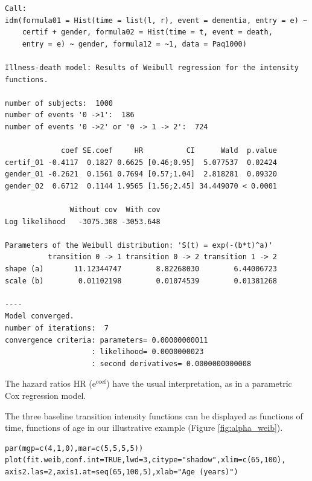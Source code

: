 \documentclass[article]{jss}
\begin{document}
\begin{verbatim}
Call:
idm(formula01 = Hist(time = list(l, r), event = dementia, entry = e) ~ 
    certif + gender, formula02 = Hist(time = t, event = death, 
    entry = e) ~ gender, formula12 = ~1, data = Paq1000)

Illness-death model: Results of Weibull regression for the intensity functions.

number of subjects:  1000 
number of events '0 ->1':  186 
number of events '0 ->2' or '0 -> 1 -> 2':  724 

             coef SE.coef     HR          CI      Wald  p.value
certif_01 -0.4117  0.1827 0.6625 [0.46;0.95]  5.077537  0.02424
gender_01 -0.2621  0.1561 0.7694 [0.57;1.04]  2.818281  0.09320
gender_02  0.6712  0.1144 1.9565 [1.56;2.45] 34.449070 < 0.0001

               Without cov  With cov
Log likelihood   -3075.308 -3053.648

Parameters of the Weibull distribution: 'S(t) = exp(-(b*t)^a)'
          transition 0 -> 1 transition 0 -> 2 transition 1 -> 2
shape (a)       11.12344747        8.82268030        6.44006723
scale (b)        0.01102198        0.01074539        0.01381268

----
Model converged.
number of iterations:  7 
convergence criteria: parameters= 0.00000000011 
                    : likelihood= 0.0000000023 
                    : second derivatives= 0.0000000000008
\end{verbatim}


The hazard ratios HR (\(\mathrm{e}^{\text{coef}}\)) have the usual interpretation, 
as in a parametric Cox regression model.

The three baseline transition intensity functions can be displayed as
functions of time, functions of age in our illustrative example 
(Figure \ref{fig:alpha_weib}).
\lstset{language=R,numbers=none}
\begin{lstlisting}
par(mgp=c(4,1,0),mar=c(5,5,5,5))
plot(fit.weib,conf.int=TRUE,lwd=3,citype="shadow",xlim=c(65,100), axis2.las=2,axis1.at=seq(65,100,5),xlab="Age (years)")
\end{lstlisting}
\end{document}
